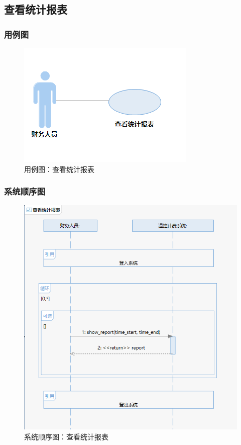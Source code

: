\documentclass[blue,normal,cn]{elegantnote}
\begin{document}
\subsection{查看统计报表}
\subsubsection{用例图}

\begin{figure}[H]
    \centering
    \includegraphics[width=.5\textwidth]{fig/276001.png}
    \caption{用例图：查看统计报表}
    \label{fig:276001}
\end{figure}

\subsubsection{系统顺序图}

\begin{figure}[H]
    \centering
    \includegraphics[width=.8\textwidth]{fig/276002.png}
    \caption{系统顺序图：查看统计报表}
    \label{fig:276002}
\end{figure}
\end{document}
